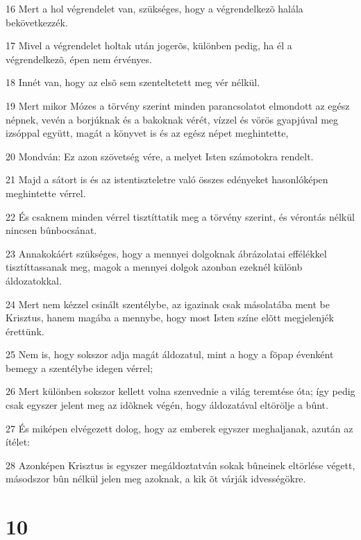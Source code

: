 \par 16 Mert a hol végrendelet van, szükséges, hogy a végrendelkezõ halála bekövetkezzék.
\par 17 Mivel a végrendelet holtak után jogerõs, különben pedig, ha él a végrendelkezõ, épen nem érvényes.
\par 18 Innét van, hogy az elsõ sem szenteltetett meg vér nélkül.
\par 19 Mert mikor Mózes a törvény szerint minden parancsolatot elmondott az egész népnek, vevén a borjúknak és a bakoknak vérét, vízzel és vörös gyapjúval meg izsóppal együtt, magát a könyvet is és az egész népet meghintette,
\par 20 Mondván: Ez azon szövetség vére, a melyet Isten számotokra rendelt.
\par 21 Majd a sátort is és az istentiszteletre való összes edényeket hasonlóképen meghintette vérrel.
\par 22 És csaknem minden vérrel tisztíttatik meg a törvény szerint, és vérontás nélkül nincsen bûnbocsánat.
\par 23 Annakokáért szükséges, hogy a mennyei dolgoknak ábrázolatai effélékkel tisztíttassanak meg, magok a mennyei dolgok azonban ezeknél különb áldozatokkal.
\par 24 Mert nem kézzel csinált szentélybe, az igazinak csak másolatába ment be Krisztus, hanem magába a mennybe, hogy most Isten színe elõtt megjelenjék érettünk.
\par 25 Nem is, hogy sokszor adja magát áldozatul, mint a hogy a fõpap évenként bemegy a szentélybe idegen vérrel;
\par 26 Mert különben sokszor kellett volna szenvednie a világ teremtése óta; így pedig csak egyszer jelent meg az idõknek végén, hogy áldozatával eltörölje a bûnt.
\par 27 És miképen elvégezett dolog, hogy az emberek egyszer meghaljanak, azután az ítélet:
\par 28 Azonképen Krisztus is egyszer megáldoztatván sokak bûneinek eltörlése végett, másodszor bûn nélkül jelen meg azoknak, a kik õt várják  idvességökre.

\chapter{10}

